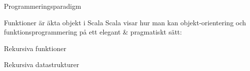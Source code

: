 \begin{Slide}{Programmeringsparadigm}
\end{Slide} 


\begin{Slide}{Funktioner är äkta objekt i Scala}
Scala visar hur man kan   objekt-orientering och funktionsprogrammering på ett elegant \& pragmatiskt sätt: \\\vspace{2em}


\end{Slide} 



\begin{Slide}{Rekursiva funktioner}
\end{Slide} 

\begin{Slide}{Rekursiva datastrukturer}
\end{Slide} 

